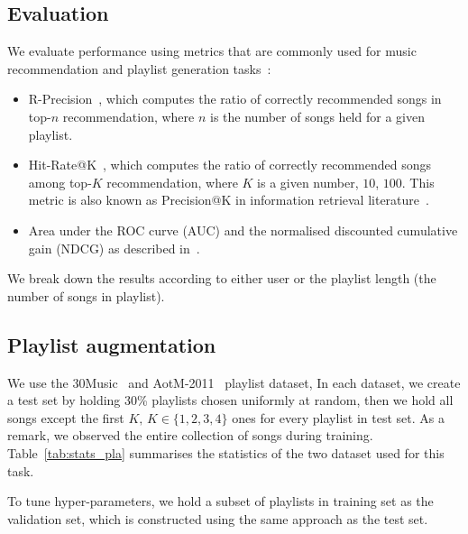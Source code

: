 \subsection{Evaluation}
We evaluate performance using metrics that are commonly used for music recommendation and playlist generation
tasks~\cite{hariri2012context,bonnin2013evaluating,jannach2015beyond,ben2017groove,schedl2017}:
\begin{itemize}
\item R-Precision~\cite{manning2008introIR}, which computes the ratio of correctly recommended songs in top-$n$ recommendation, 
      where $n$ is the number of songs held for a given playlist.
\item Hit-Rate@K~\cite{hariri2012context}, which computes the ratio of correctly recommended songs among top-$K$ recommendation, 
      where $K$ is a given number, \eg $10$, $100$. 
      This metric is also known as Precision@K in information retrieval literature~\cite{manning2008introIR}.
\item Area under the ROC curve (AUC) and the normalised discounted cumulative gain (NDCG) as described in~\cite{agarwal2011infinite}.
\end{itemize}
We break down the results according to either user or the playlist length (\ie the number of songs in playlist).


\subsection{Playlist augmentation}
\label{ssec:pla}

We use the 30Music~\cite{30music2015} and AotM-2011~\cite{mcfee2012hypergraph} playlist dataset,
In each dataset, we create a test set by holding 30\% playlists chosen uniformly at random,
then we hold all songs except the first $K, \, K \in \{1,2,3,4\}$ ones for every playlist in test set.
As a remark, we observed the entire collection of songs during training.
Table~\ref{tab:stats_pla} summarises the statistics of the two dataset used for this task.

To tune hyper-parameters, we hold a subset of playlists in training set as the validation set, 
which is constructed using the same approach as the test set.

